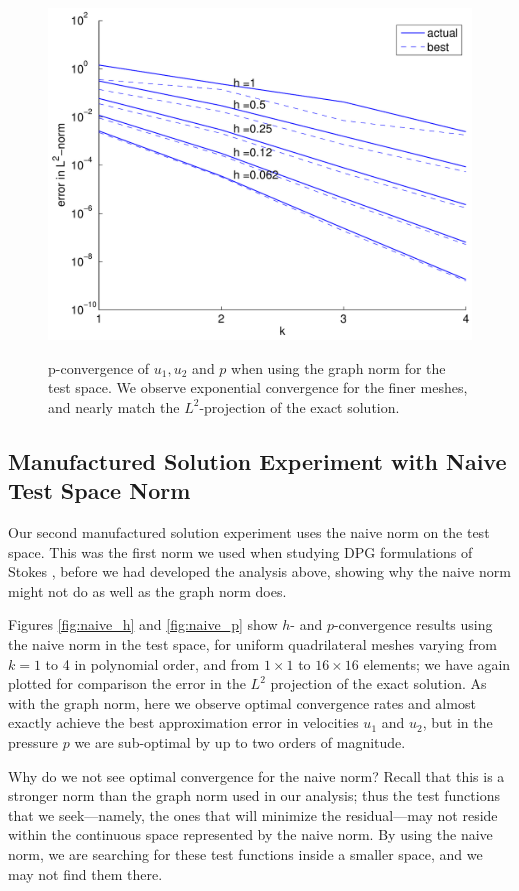 \begin{figure}[h!b!p!]
{\includegraphics[scale=0.42]{./figures/pressure_graph_p.pdf}
\label{fig:pressuregraph_p}
}
\caption{p-convergence of $u_{1},u_{2}$ and $p$ when using the graph norm for the test space.  We observe exponential convergence for the finer meshes, and nearly match the $L^{2}$-projection of the exact solution.
}
\label{fig:graph_p}
\end{figure}

\subsection{Manufactured Solution Experiment with Naive Test Space Norm}
Our second manufactured solution experiment uses the naive norm on the test space.  This was the first norm we used when studying DPG formulations of Stokes \cite{RobertsetAl10}, before we had developed the analysis above, showing why the naive norm might not do as well as the graph norm does.

Figures \ref{fig:naive_h} and \ref{fig:naive_p} show $h$- and $p$-convergence results using the naive norm in the test space, for uniform quadrilateral meshes varying from $k=1$ to 4 in polynomial order, and from $1 \times 1$ to $16 \times 16$ elements; we have again plotted for comparison the error in the $L^{2}$ projection of the exact solution.  As with the graph norm, here we observe optimal convergence rates and almost exactly achieve the best approximation error in velocities $u_{1}$ and $u_{2}$, but in the pressure $p$ we are sub-optimal by up to two orders of magnitude.  

Why do we not see optimal convergence for the naive norm?  Recall that this is a stronger norm than the graph norm used in our analysis; thus the test functions that we seek---namely, the ones that will minimize the residual---may not reside within the continuous space represented by the naive norm.  By using the naive norm, we are searching for these test functions inside a smaller space, and we may not find them there.

